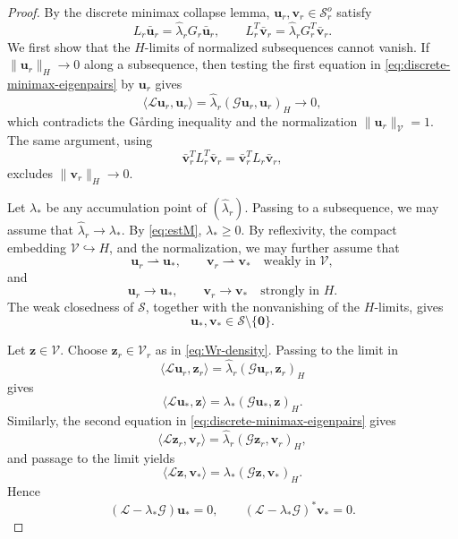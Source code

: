 \documentclass[10pt,a4paper]{amsart}
\begin{document}
\begin{proof}
	By the discrete minimax collapse lemma,
	\(\mathbf u_r,\mathbf v_r\in\mathcal S_r^o\) satisfy
	\begin{equation}\label{eq:discrete-minimax-eigenpairs}
		L_r\bar{\mathbf u}_r
		=
		\hat\lambda_r G_r\bar{\mathbf u}_r,
		\qquad
		L_r^T\bar{\mathbf v}_r
		=
		\hat\lambda_r G_r^T\bar{\mathbf v}_r.
	\end{equation}
	We first show that the \(H\)-limits of normalized subsequences cannot vanish.
	If \(\|\mathbf u_r\|_H\to0\) along a subsequence, then testing the first
	equation in \eqref{eq:discrete-minimax-eigenpairs} by \(\mathbf u_r\) gives
	\[
	\langle\mathcal L\mathbf u_r,\mathbf u_r\rangle
	=
	\hat\lambda_r(\mathcal G\mathbf u_r,\mathbf u_r)_H
	\to
	0,
	\]
	which contradicts the G{\aa}rding inequality and the normalization
	\(\|\mathbf u_r\|_{\mathcal V}=1\). The same argument, using
	\[
	\bar{\mathbf v}_r^T L_r^T\bar{\mathbf v}_r
	=
	\bar{\mathbf v}_r^T L_r\bar{\mathbf v}_r,
	\]
	excludes \(\|\mathbf v_r\|_H\to0\).
	
	Let \(\lambda_*\) be any accumulation point of \((\hat\lambda_r)\). Passing
	to a subsequence, we may assume that \(\hat\lambda_r\to\lambda_*\). By
	\eqref{eq:estM}, \(\lambda_*\ge0\). By reflexivity, the compact embedding
	\(\mathcal V\hookrightarrow H\), and the normalization, we may further
	assume that
	\[
	\mathbf u_r\rightharpoonup\mathbf u_*,
	\qquad
	\mathbf v_r\rightharpoonup\mathbf v_*
	\quad\text{weakly in }\mathcal V,
	\]
	and
	\[
	\mathbf u_r\to\mathbf u_*,
	\qquad
	\mathbf v_r\to\mathbf v_*
	\quad\text{strongly in }H.
	\]
	The weak closedness of \(\mathcal S\), together with the nonvanishing of the
	\(H\)-limits, gives
	\[
	\mathbf u_*,\mathbf v_*
	\in
	\mathcal S\setminus\{\mathbf0\}.
	\]
	
	Let \(\mathbf z\in\mathcal V\). Choose
	\(\mathbf z_r\in\mathcal V_r\) as in \eqref{eq:Wr-density}. Passing to the
	limit in
	\[
	\langle\mathcal L\mathbf u_r,\mathbf z_r\rangle
	=
	\hat\lambda_r(\mathcal G\mathbf u_r,\mathbf z_r)_H
	\]
	gives
	\[
	\langle\mathcal L\mathbf u_*,\mathbf z\rangle
	=
	\lambda_*(\mathcal G\mathbf u_*,\mathbf z)_H.
	\]
	Similarly, the second equation in \eqref{eq:discrete-minimax-eigenpairs}
	gives
	\[
	\langle\mathcal L\mathbf z_r,\mathbf v_r\rangle
	=
	\hat\lambda_r(\mathcal G\mathbf z_r,\mathbf v_r)_H,
	\]
	and passage to the limit yields
	\[
	\langle\mathcal L\mathbf z,\mathbf v_*\rangle
	=
	\lambda_*(\mathcal G\mathbf z,\mathbf v_*)_H.
	\]
	Hence
	\begin{equation}\label{eq:LimEq}
		(\mathcal L-\lambda_*\mathcal G)\mathbf u_*=0,
		\qquad
		(\mathcal L-\lambda_*\mathcal G)^*\mathbf v_*=0.
	\end{equation}
	

\end{proof}
\end{document}
